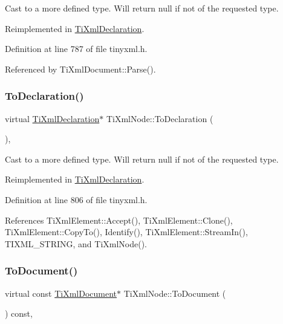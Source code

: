 Cast to a more defined type. Will return null if not of the requested type. 



Reimplemented in \hyperlink{class_ti_xml_declaration_aab62703b620d9b9391b482dc1835ecf6}{Ti\+Xml\+Declaration}.



Definition at line 787 of file tinyxml.\+h.



Referenced by Ti\+Xml\+Document\+::\+Parse().

\hypertarget{class_ti_xml_node_a4027136ca820ff4a636b607231b6a6df}{}\label{class_ti_xml_node_a4027136ca820ff4a636b607231b6a6df} 
\subsubsection{\texorpdfstring{To\+Declaration()}{ToDeclaration()}\hspace{0.1cm}{\footnotesize\ttfamily [2/2]}}
{\footnotesize\ttfamily virtual \hyperlink{class_ti_xml_declaration}{Ti\+Xml\+Declaration}$\ast$ Ti\+Xml\+Node\+::\+To\+Declaration (\begin{DoxyParamCaption}{ }\end{DoxyParamCaption})\hspace{0.3cm}{\ttfamily [inline]}, {\ttfamily [virtual]}}



Cast to a more defined type. Will return null if not of the requested type. 



Reimplemented in \hyperlink{class_ti_xml_declaration_a6bd3d1daddcaeb9543c24bfd090969ce}{Ti\+Xml\+Declaration}.



Definition at line 806 of file tinyxml.\+h.



References Ti\+Xml\+Element\+::\+Accept(), Ti\+Xml\+Element\+::\+Clone(), Ti\+Xml\+Element\+::\+Copy\+To(), Identify(), Ti\+Xml\+Element\+::\+Stream\+In(), T\+I\+X\+M\+L\+\_\+\+S\+T\+R\+I\+NG, and Ti\+Xml\+Node().

\hypertarget{class_ti_xml_node_a775a904618cad6e4a8049bda4f5a6aa9}{}\label{class_ti_xml_node_a775a904618cad6e4a8049bda4f5a6aa9} 
\subsubsection{\texorpdfstring{To\+Document()}{ToDocument()}\hspace{0.1cm}{\footnotesize\ttfamily [1/2]}}
{\footnotesize\ttfamily virtual const \hyperlink{class_ti_xml_document}{Ti\+Xml\+Document}$\ast$ Ti\+Xml\+Node\+::\+To\+Document (\begin{DoxyParamCaption}{ }\end{DoxyParamCaption}) const\hspace{0.3cm}{\ttfamily [inline]}, {\ttfamily [virtual]}}



